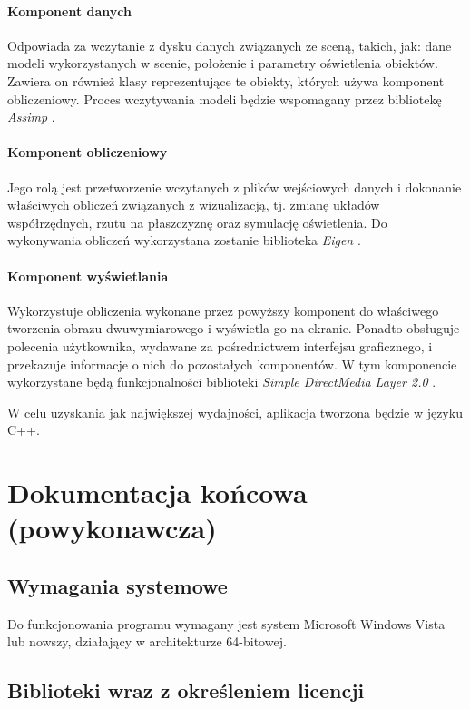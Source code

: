 \documentclass[10pt,a4paper]{article}
\begin{document}
\paragraph{Komponent danych}
Odpowiada za wczytanie z dysku danych związanych ze sceną, takich, jak: dane modeli wykorzystanych w scenie, położenie i parametry oświetlenia obiektów. Zawiera on również klasy reprezentujące te obiekty, których używa komponent obliczeniowy. Proces wczytywania modeli będzie wspomagany przez bibliotekę \emph{Assimp} \cite{assimp}.

\paragraph{Komponent obliczeniowy}
Jego rolą jest przetworzenie wczytanych z plików wejściowych danych i dokonanie właściwych obliczeń związanych z wizualizacją, tj. zmianę układów współrzędnych, rzutu na płaszczyznę oraz symulację oświetlenia. Do wykonywania obliczeń wykorzystana zostanie biblioteka \emph{Eigen} \cite{eigen}.

\paragraph{Komponent wyświetlania}
Wykorzystuje obliczenia wykonane przez powyższy komponent do właściwego tworzenia obrazu dwuwymiarowego i wyświetla go na ekranie. Ponadto obsługuje polecenia użytkownika, wydawane za pośrednictwem interfejsu graficznego, i przekazuje informacje o nich do pozostałych komponentów. W tym komponencie wykorzystane będą funkcjonalności biblioteki \emph{Simple DirectMedia Layer 2.0} \cite{sdl}.

W celu uzyskania jak największej wydajności, aplikacja tworzona będzie w języku C++.

\newpage

\section{Dokumentacja końcowa (powykonawcza)}

\subsection{Wymagania systemowe}

Do funkcjonowania programu wymagany jest system Microsoft Windows Vista lub nowszy, działający w architekturze 64-bitowej.

\subsection{Biblioteki wraz z określeniem licencji}
\end{document}
